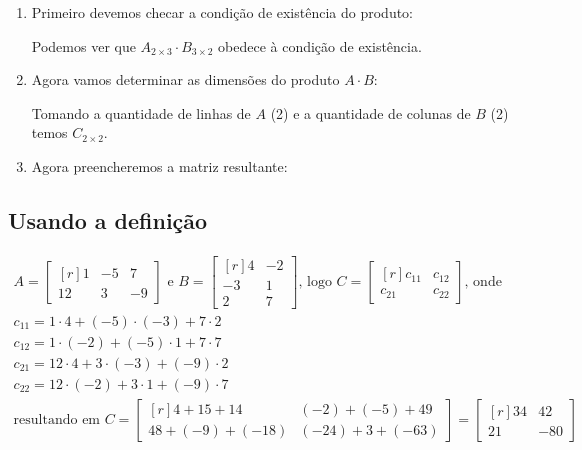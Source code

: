 \begin{enumerate}
    \item Primeiro devemos checar a condição de existência do produto: 
    
    Podemos ver que $A_{2\times3}\cdot B_{3\times 2}$ obedece à condição de existência. \checkmark
    
    \item Agora vamos determinar as dimensões do produto $A\cdot B$: 
    
    Tomando a quantidade de linhas de $A$ (2) e a quantidade de colunas de $B$ (2) temos $C_{2\times2}$.
    
    \item Agora preencheremos a matriz resultante:

\end{enumerate}

\subsection{Usando a definição}

\begin{gather*}
    A=\begin{bmatrix*}[r]
    1 & -5 & 7 \\ 12 & 3 & -9
    \end{bmatrix*} \text{ e }B=\begin{bmatrix*}[r]
    4 & -2 \\ -3 & 1 \\ 2 & 7
    \end{bmatrix*} \text{, logo }C=\begin{bmatrix*}[r]
    c_{11} & c_{12} \\ c_{21} & c_{22}
    \end{bmatrix*}\text{, onde} \\
    c_{11} = 1 \cdot 4 + (-5) \cdot (-3) + 7 \cdot 2 \\
    c_{12} = 1 \cdot (-2) + (-5) \cdot 1 + 7 \cdot 7 \\
    c_{21} = 12 \cdot 4 + 3 \cdot (-3) + (-9) \cdot 2 \\
    c_{22} = 12 \cdot (-2) + 3 \cdot 1 + (-9) \cdot 7 \\
    \text{resultando em }C=\begin{bmatrix*}[r]
    4 + 15 + 14 &
    (-2) + (-5) + 49 \\
    48 + (-9) + (-18) &
    (-24) + 3 + (-63)
    \end{bmatrix*}=\begin{bmatrix*}[r]
    34 & 42 \\
    21 & -80
    \end{bmatrix*}
\end{gather*}

